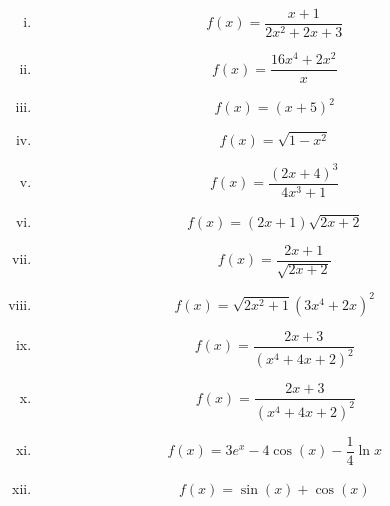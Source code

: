 \documentclass[]{article}
\begin{document}
\begin{enumerate}[(i)]
\item		 \[ f(x) = \frac{x+1}{2x^2+2x+3} \,\] %
\item		 \[ f(x) = \frac{16x^4+2x^2}{x} \,\] %
\item		\[ f(x) = (x+5)^2 \,\] %
\item 		 \[ f(x) = \sqrt{1-x^2} \,\] %
\item 		 \[ f(x) = \frac{(2x+4)^3}{4x^3+1} \,\] %
\item 		 \[ f(x) = (2x+1)\sqrt{2x+2} \,\] %
\item 		 \[ f(x) = \frac{2x+1}{\sqrt{2x+2}} \,\] %
\item 		 \[ f(x) = \sqrt{2x^2+1}(3x^4+2x)^2 \,\] %
\item 		\[ f(x) = \frac{2x+3}{(x^4+4x+2)^2} \,\] 
\item \[f(x) = \frac{2x+3}{(x^4+4x+2)^2}\]

\item  \[f(x) = 3e^x-4\cos (x) - \frac{1}{4}\ln x\,\]
\item \[f(x) = \sin(x)+\cos(x)\,\]

\end{enumerate}
\end{document}
